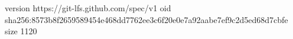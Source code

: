 version https://git-lfs.github.com/spec/v1
oid sha256:8573b8f2659589454e468dd7762ee3c6f20e0e7a92aabe7ef9c2d5ed68d7cbfe
size 1120
